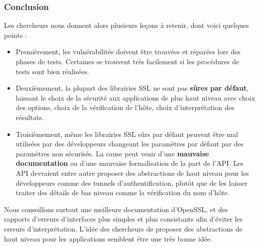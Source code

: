 \subsubsection{Conclusion}

Les chercheurs nous donnent alors plusieurs leçons à retenir, dont voici quelques points :
\begin{itemize}
\item Premièrement, les vulnérabilités doivent être trouvées et réparées lors des phases de tests. Certaines se trouvent très facilement si les procédures de tests sont bien réalisées.
\item Deuxièmement, la plupart des librairies SSL ne sont pas \textbf{sûres par défaut}, laissant le choix de la sécurité aux applications de plus haut niveau avec choix des options, choix de la vérification de l'hôte, choix d'interprétation des résultats.
\item Troisièmement, même les librairies SSL sûrs par défaut peuvent être mal utilisées par des développeurs changeant les paramètres par défaut par des paramètres non sécurisés. La cause peut venir d'une \textbf{mauvaise documentation} ou d'une mauvaise formalisation de la part de l'API. Les API devraient entre autre proposer des abstractions de haut niveau pour les développeurs comme des tunnels d'authentification, plutôt que de les laisser traiter des détails de bas niveau comme la vérification du nom d'hôte.\\
\end{itemize}

Nous conseillons surtout une meilleure documentation d'OpenSSL, et des rapports d'erreurs d'interfaces plus simples et plus consistants afin d'éviter les erreurs d'interprétation. L'idée des chercheurs de proposer des abstractions de haut niveau pour les applications semblent être une très bonne idée.